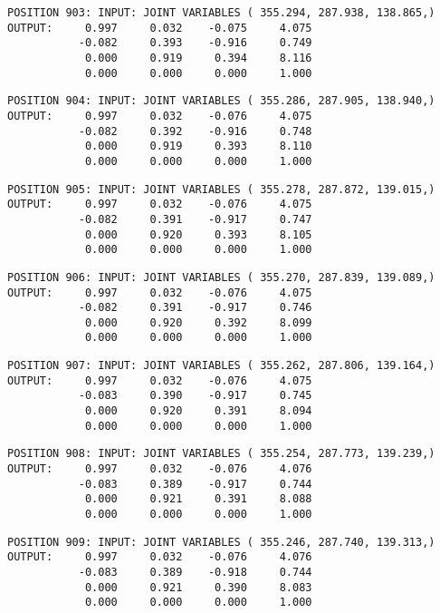 \begin{verbatim}
POSITION 903: INPUT: JOINT VARIABLES ( 355.294, 287.938, 138.865,)
OUTPUT:     0.997     0.032    -0.075     4.075
           -0.082     0.393    -0.916     0.749
            0.000     0.919     0.394     8.116
            0.000     0.000     0.000     1.000
\end{verbatim} \pagebreak[1]\begin{verbatim}
POSITION 904: INPUT: JOINT VARIABLES ( 355.286, 287.905, 138.940,)
OUTPUT:     0.997     0.032    -0.076     4.075
           -0.082     0.392    -0.916     0.748
            0.000     0.919     0.393     8.110
            0.000     0.000     0.000     1.000
\end{verbatim} \pagebreak[1]\begin{verbatim}
POSITION 905: INPUT: JOINT VARIABLES ( 355.278, 287.872, 139.015,)
OUTPUT:     0.997     0.032    -0.076     4.075
           -0.082     0.391    -0.917     0.747
            0.000     0.920     0.393     8.105
            0.000     0.000     0.000     1.000
\end{verbatim} \pagebreak[1]\begin{verbatim}
POSITION 906: INPUT: JOINT VARIABLES ( 355.270, 287.839, 139.089,)
OUTPUT:     0.997     0.032    -0.076     4.075
           -0.082     0.391    -0.917     0.746
            0.000     0.920     0.392     8.099
            0.000     0.000     0.000     1.000
\end{verbatim} \pagebreak[1]\begin{verbatim}
POSITION 907: INPUT: JOINT VARIABLES ( 355.262, 287.806, 139.164,)
OUTPUT:     0.997     0.032    -0.076     4.075
           -0.083     0.390    -0.917     0.745
            0.000     0.920     0.391     8.094
            0.000     0.000     0.000     1.000
\end{verbatim} \pagebreak[1]\begin{verbatim}
POSITION 908: INPUT: JOINT VARIABLES ( 355.254, 287.773, 139.239,)
OUTPUT:     0.997     0.032    -0.076     4.076
           -0.083     0.389    -0.917     0.744
            0.000     0.921     0.391     8.088
            0.000     0.000     0.000     1.000
\end{verbatim} \pagebreak[1]\begin{verbatim}
POSITION 909: INPUT: JOINT VARIABLES ( 355.246, 287.740, 139.313,)
OUTPUT:     0.997     0.032    -0.076     4.076
           -0.083     0.389    -0.918     0.744
            0.000     0.921     0.390     8.083
            0.000     0.000     0.000     1.000
\end{verbatim} \pagebreak[1]\begin{verbatim}

\end{verbatim}
